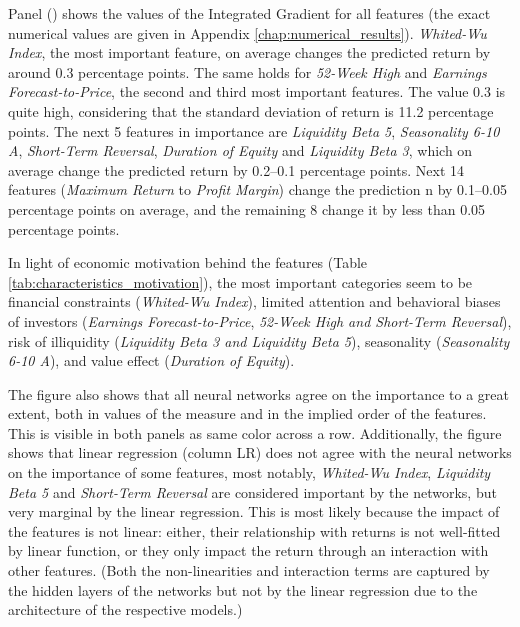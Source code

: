 		Panel () shows the values of the Integrated Gradient for all features (the exact numerical values are given in Appendix \ref{chap:numerical_results}). \textit{Whited-Wu Index}, the most important feature, on average changes the predicted return by around 0.3 percentage points. The same holds for \textit{52-Week High} and \textit{Earnings Forecast-to-Price}, the second and third most important features. The value 0.3 is quite high, considering that the standard deviation of return is 11.2 percentage points. The next 5 features in importance are \textit{Liquidity Beta 5}, \textit{Seasonality 6-10 A}, \textit{Short-Term Reversal}, \textit{Duration of Equity} and \textit{Liquidity Beta 3}, which on average change the predicted return by 0.2--0.1 percentage points. Next 14 features (\textit{Maximum Return} to \textit{Profit Margin}) change the prediction n by 0.1--0.05 percentage points on average, and the remaining 8 change it by less than 0.05 percentage points.
		
		In light of economic motivation behind the features (Table \ref{tab:characteristics_motivation}), the most important categories seem to be financial constraints (\textit{Whited-Wu Index}), limited attention and behavioral biases of investors (\textit{Earnings Forecast-to-Price}, \textit{52-Week High and Short-Term Reversal}), risk of illiquidity (\textit{Liquidity Beta 3 and Liquidity Beta 5}), seasonality (\textit{Seasonality 6-10 A}), and value effect (\textit{Duration of Equity}). 
		
		The figure also shows that all neural networks agree on the importance to a great extent, both in values of the measure and in the implied order of the features. This is visible in both panels as same color across a row. Additionally, the figure shows that linear regression (column LR) does not agree with the neural networks on the importance of some features, most notably, \textit{Whited-Wu Index}, \textit{Liquidity Beta 5} and \textit{Short-Term Reversal} are considered important by the networks, but very marginal by the linear regression. This is most likely because the impact of the features is not linear: either, their relationship with returns is not well-fitted by linear function, or they only impact the return through an interaction with other features. (Both the non-linearities and interaction terms are captured by the hidden layers of the networks but not by the linear regression due to the architecture of the respective models.)  	
	

